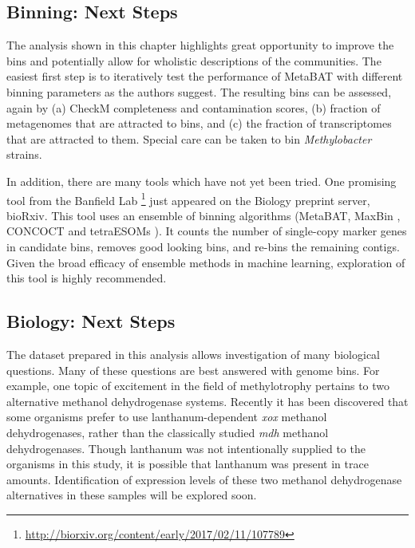 \subsection{Binning: Next Steps}

The analysis shown in this chapter highlights great opportunity to improve the bins and potentially allow for wholistic descriptions of the communities.
The easiest first step is to iteratively test the performance of MetaBAT with different binning parameters as the authors suggest.
The resulting bins can be assessed, again by (a) CheckM completeness and contamination scores, (b) fraction of metagenomes that are attracted to bins, and (c) the fraction of transcriptomes that are attracted to them.
Special care can be taken to bin \textit{Methylobacter} strains.

In addition, there are many tools which have not yet been tried.
One promising tool from the Banfield Lab \cite{sieber2017}\footnote{\url{http://biorxiv.org/content/early/2017/02/11/107789}} just appeared on the Biology preprint server, bioRxiv.
This tool uses an ensemble of binning algorithms (MetaBAT\cite{metabat2015}, MaxBin \cite{wu2015}, CONCOCT \cite{concoct2014} and tetraESOMs \cite{dick2009}).
It counts the number of single-copy marker genes in candidate bins, removes good looking bins, and re-bins the remaining contigs.
Given the broad efficacy of ensemble methods in machine learning, exploration of this tool is highly recommended.



\subsection{Biology: Next Steps}

The dataset prepared in this analysis allows investigation of many biological questions.
Many of these questions are best answered with genome bins.
For example, one topic of excitement in the field of methylotrophy pertains to two alternative methanol dehydrogenase systems.
Recently it has been discovered that some organisms prefer to use lanthanum-dependent \textit{xox} methanol dehydrogenases, rather than the classically studied \textit{mdh} methanol dehydrogenases. %
Though lanthanum was not intentionally supplied to the organisms in this study, it is possible that lanthanum was present in trace amounts.
Identification of expression levels of these two methanol dehydrogenase alternatives in these samples will be explored soon.

